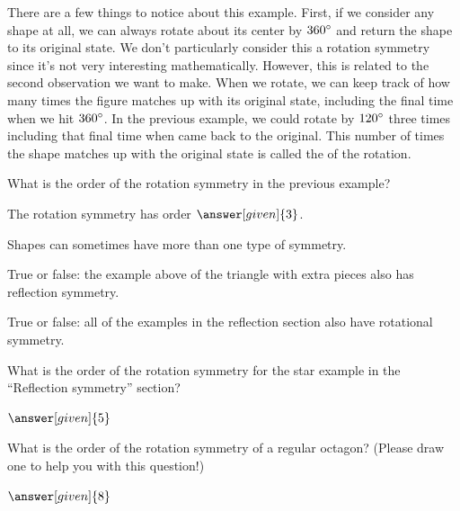 \documentclass{ximera}
\begin{document}
There are a few things to notice about this example. First, if we consider any shape at all, we can always rotate about its center 
by $360\degree$ and return the shape to its original state. We don't particularly consider this a rotation symmetry since it's not 
very interesting mathematically. However, this is related to the second observation we want to make. When we rotate, we can keep track 
of how many times the figure matches up with its original state, including the final time when we hit $360\degree$. In the previous 
example, we could rotate by $120\degree$ three times including that final time when came back to the original. This number of times 
the shape matches up with the original state is called the  of the rotation.
\begin{question}
What is the order of the rotation symmetry in the previous example? 

\begin{prompt}
The rotation symmetry has order $\answer[given]{3}$.
\end{prompt}
 \end{question}

Shapes can sometimes have more than one type of symmetry.
\begin{question}
True or false: the example above of the triangle with extra pieces also has reflection symmetry.
\begin{multipleChoice}
\end{multipleChoice}

True or false: all of the examples in the reflection section also have rotational symmetry.
\begin{multipleChoice}
\end{multipleChoice}
\end{question}

\begin{question}
What is the order of the rotation symmetry for the star example in the ``Reflection symmetry'' section?
\begin{prompt}
$\answer[given]{5}$
\end{prompt}

What is the order of the rotation symmetry of a regular octagon? (Please draw one to help you with this question!)
\begin{prompt}
$\answer[given]{8}$
\end{prompt}

\end{question}
\end{document}
